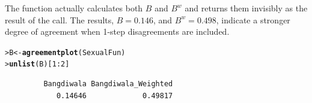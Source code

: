 \documentclass[10pt,krantz2]{krantz}\usepackage[]{graphicx}\usepackage[]{color}
\makeatletter
\newcommand{\hlnum}[1]{\textcolor[rgb]{0.686,0.059,0.569}{#1}}%
\newcommand{\hlopt}[1]{\textcolor[rgb]{0,0,0}{#1}}%
\newcommand{\hlstd}[1]{\textcolor[rgb]{0.345,0.345,0.345}{#1}}%
\newcommand{\hlkwb}[1]{\textcolor[rgb]{0.69,0.353,0.396}{#1}}%
\newcommand{\hlkwd}[1]{\textcolor[rgb]{0.737,0.353,0.396}{\textbf{#1}}}%
\newenvironment{kframe}{%
 \def\at@end@of@kframe{}%
 \ifinner\ifhmode%
  \def\at@end@of@kframe{\end{minipage}}%
  \begin{minipage}{\columnwidth}%
 \fi\fi%
 \def\FrameCommand##1{\hskip\@totalleftmargin \hskip-\fboxsep
 \colorbox{shadecolor}{##1}\hskip-\fboxsep
     \hskip-\linewidth \hskip-\@totalleftmargin \hskip\columnwidth}%
 \MakeFramed {\advance\hsize-\width
   \@totalleftmargin\z@ \linewidth\hsize
   \@setminipage}}%
 {\par\unskip\endMakeFramed%
 \at@end@of@kframe}
\newenvironment{knitrout}{}{} %
\renewenvironment{knitrout}{\small\renewcommand{\baselinestretch}{.85}}{} %
\makeatother
\begin{document}
The function  actually calculates both $B$ and $B^w$
and returns them invisibly as the result of the call.
The results, $B = 0.146$, and $B^w = 0.498$, indicate a stronger
degree of agreement when 1-step disagreements are included.
\begin{knitrout}
\color{fgcolor}\begin{kframe}
\begin{alltt}
\hlstd{> }\hlstd{B} \hlkwb{<-}\hlkwd{agreementplot}\hlstd{(SexualFun)}
\hlstd{> }\hlkwd{unlist}\hlstd{(B)[}\hlnum{1}\hlopt{:}\hlnum{2}\hlstd{]}
\end{alltt}
\begin{verbatim}
         Bangdiwala Bangdiwala_Weighted 
            0.14646             0.49817 
\end{verbatim}
\end{kframe}
\end{knitrout}
\end{document}
